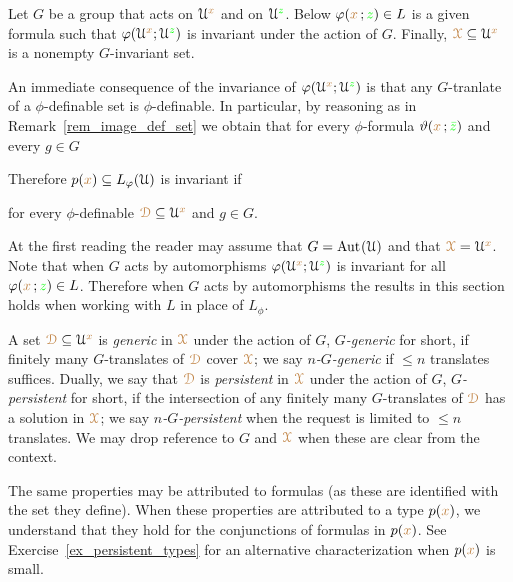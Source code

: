 \begin{assumption}\label{notation_GXphi}
  Let $G$ be a group that acts on $\EuScript U^{\color{brown} x}$ and on $\EuScript U^{\color{green} z}$.
  Below $\varphi({\color{brown} x}\,;{\color{green} z})\in L$ is a given formula such that $\varphi(\EuScript U^{\color{brown} x};\EuScript U^{\color{green} z})$ is invariant under the action of $G$.
  Finally, ${\color{brown}\EuScript X}\subseteq\EuScript U^{\color{brown} x}$ is a nonempty $G$-invariant set.
\end{assumption}

An immediate consequence of the invariance of $\varphi(\EuScript U^{\color{brown} x};\EuScript U^{\color{green} z})$ is 
that any $G$-tranlate of a $\phi$-definable set is $\phi$-definable.
In particular, by reasoning as in Remark~\ref{rem_image_def_set} we obtain that for every $\phi$-formula $\vartheta({\color{brown} x}\,;{\color{green}\bar z})$ and every $g\in G$


Therefore $p({\color{brown} x})\subseteq L_\varphi(\EuScript U)$ is invariant if

\hfill for every $\phi$-definable ${\color{brown}\EuScript D}\subseteq\EuScript U^{\color{brown} x}$ and $g\in G$.

At the first reading the reader may assume that $G={\rm Aut\kern.15ex}(\EuScript U)$ and that ${\color{brown}\EuScript X}=\EuScript U^{\color{brown} x}$.
Note that when $G$ acts by automorphisms $\varphi(\EuScript U^{\color{brown} x};\EuScript U^{\color{green} z})$ is invariant for all $\varphi({\color{brown} x}\,;{\color{green} z})\in L$.
Therefore when $G$ acts by automorphisms the results in this section holds when working with $L$ in place of $L_\phi$.

A set ${\color{brown}\EuScript D}\subseteq\EuScript U^{\color{brown} x}$ is \emph{generic\/} in ${\color{brown}\EuScript X}$ under the action of $G$, \emph{$G$-generic\/} for short, if finitely many $G$-translates of ${\color{brown}\EuScript D}$ cover ${\color{brown}\EuScript X}$; we say \emph{$n$-$G$-generic\/} if $\le n$ translates suffices.
Dually, we say that ${\color{brown}\EuScript D}$ is \emph{persistent\/} in ${\color{brown}\EuScript X}$ under the action of $G$, \emph{$G$-persistent\/} for short, if the intersection of any finitely many $G$-translates of ${\color{brown}\EuScript D}$ has a solution in ${\color{brown}\EuScript X}$; we say \emph{$n$-$G$-persistent\/} when the request is limited to $\le n$ translates.
We may drop reference to $G$ and ${\color{brown}\EuScript X}$ when these are clear from the context.

The same properties may be attributed to formulas (as these are identified with the set they define).
When these properties are attributed to a type $p({\color{brown} x})$, we understand that they hold for the conjunctions of formulas in $p({\color{brown} x})$.
See Exercise~\ref{ex_persistent_types} for an alternative characterization when $p({\color{brown} x})$ is small.

